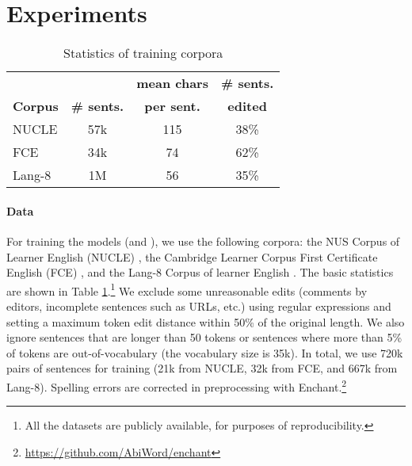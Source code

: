 \section{Experiments}
\label{sec:experiment}
\vspace{-1mm}
\begin{table}[t]
\small
\centering
\begin{tabular}{l|c|c|c}
\hline
       &     & {\bf mean chars} & {\bf \# sents.} \\
{\bf Corpus} & {\bf \# sents.} & {\bf per sent.}  & {\bf edited}   \\ \hline\hline
NUCLE  & 57k & 115             & 38\%          \\
FCE    & 34k & 74              & 62\%          \\
Lang-8 & 1M  & 56              & 35\%          \\ \hline
\end{tabular}
\caption{Statistics of training corpora}
\label{tab:corpora}
\vspace{-4mm}
\end{table}

\vspace{-1mm}
\paragraph{Data} For training the models (\mle and \proposed), we use the following corpora: 
the NUS Corpus of Learner English (NUCLE) \cite{dahlmeier-ng-wu:2013:BEA8}, 
the Cambridge Learner Corpus First Certificate English (FCE) \cite{yannakoudakis-briscoe-medlock:2011:ACL-HLT2011}, and
the Lang-8 Corpus of learner English \cite{tajiri-komachi-matsumoto:2012:ACL2012short}. 
The basic statistics are shown in Table \ref{tab:corpora}.\footnote{All the datasets are publicly available, for purposes of reproducibility.}
We exclude some unreasonable edits (comments by editors, incomplete sentences such as URLs, etc.) using regular expressions and setting a maximum token edit distance within 50\% of the original length.
We also ignore sentences that are longer than 50 tokens or sentences where more than 5\% of tokens are out-of-vocabulary (the vocabulary size is 35k).
In total, we use 720k pairs of sentences for training (21k from NUCLE, 32k from FCE, and 667k from Lang-8).
Spelling errors are corrected in preprocessing with Enchant.\footnote{\url{https://github.com/AbiWord/enchant}}

